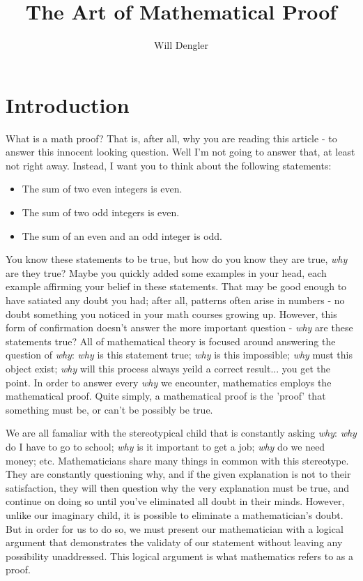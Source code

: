\documentclass[a4paper,12pt]{article}
\begin{document}
\title{The Art of Mathematical Proof}
\author{Will Dengler}
\maketitle

\section{Introduction}
What is a math proof? That is, after all, why you are reading this article - to answer this innocent looking question. Well I'm not going to answer that, at least not right away. Instead, I want you to think about the following statements:
\begin{itemize}
	\item The sum of two even integers is even.
	\item The sum of two odd integers is even.
	\item The sum of an even and an odd integer is odd.
\end{itemize}

You know these statements to be true, but how do you know they are true, \textit{why} are they true? Maybe you quickly added some examples in your head, each example affirming your belief in these statements. That may be good enough to have satiated any doubt you had; after all, patterns often arise in numbers - no doubt something you noticed in your math courses growing up. However, this form of confirmation doesn't answer the more important question - \textit{why} are these statements true? All of mathematical theory is focused around answering the question of \textit{why}: \textit{why} is this statement true; \textit{why} is this impossible; \textit{why} must this object exist; \textit{why} will this process always yeild a correct result... you get the point. In order to answer every \textit{why} we encounter, mathematics employs the mathematical proof. Quite simply, a mathematical proof is the 'proof' that something must be, or can't be possibly be true. 

We are all famaliar with the stereotypical child that is constantly asking \textit{why}: \textit{why} do I have to go to school; \textit{why} is it important to get a job; \textit{why} do we need money; etc. Mathematicians share many things in common with this stereotype. They are constantly questioning why, and if the given explanation is not to their satisfaction, they will then question why the very explanation must be true, and continue on doing so until you've eliminated all doubt in their minds. However, unlike our imaginary child, it is possible to eliminate a mathematician's doubt. But in order for us to do so, we must present our mathematician with a logical argument that demonstrates the validaty of our statement without leaving any possibility unaddressed. This logical argument is what mathematics refers to as a proof.  
  
\end{document}
